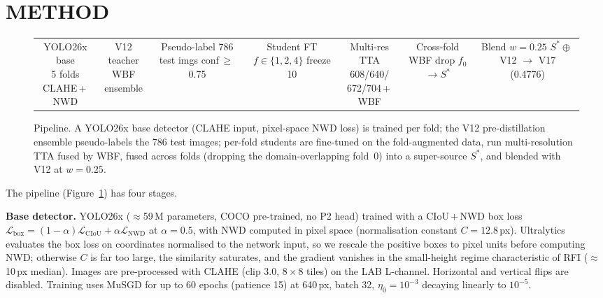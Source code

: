 \documentclass{article}
\begin{document}
\section{METHOD}
\label{sec:method}

\begin{figure}[t]
\centering
\setlength{\fboxsep}{3pt}
\scriptsize
\begin{tabular}{@{}c@{$\,\to\,$}c@{$\,\to\,$}c@{$\,\to\,$}c@{$\,\to\,$}c@{$\,\to\,$}c@{$\,\to\,$}c@{}}
\fbox{\parbox[c][12mm][c]{17mm}{\centering YOLO26x base\\5 folds\\CLAHE\,+\,NWD}} &
\fbox{\parbox[c][12mm][c]{15mm}{\centering V12 teacher\\WBF\\ensemble}} &
\fbox{\parbox[c][12mm][c]{17mm}{\centering Pseudo-label\\786 test imgs\\conf\,$\ge$\,0.75}} &
\fbox{\parbox[c][12mm][c]{17mm}{\centering Student FT\\$f\!\in\!\{1,2,4\}$\\freeze 10}} &
\fbox{\parbox[c][12mm][c]{18mm}{\centering Multi-res TTA\\608/640/\\672/704\,+\,WBF}} &
\fbox{\parbox[c][12mm][c]{17mm}{\centering Cross-fold WBF\\drop $f_0$\\$\to S^{*}$}} &
\fbox{\parbox[c][12mm][c]{19mm}{\centering Blend $w{=}0.25$\\$S^{*}\!\oplus$\,V12\\$\to$ V17 (0.4776)}} \\
\end{tabular}
\caption{Pipeline. A YOLO26x base detector (CLAHE input, pixel-space
NWD loss) is trained per fold; the V12 pre-distillation ensemble
pseudo-labels the 786 test images; per-fold students are fine-tuned
on the fold-augmented data, run multi-resolution TTA fused by WBF,
fused across folds (dropping the domain-overlapping fold~0) into a
super-source $S^{*}$, and blended with V12 at $w{=}0.25$.}
\label{fig:pipeline}
\end{figure}

The pipeline (Figure~\ref{fig:pipeline}) has four stages.

\textbf{Base detector.} YOLO26x \cite{ultralytics2024yolo11}
($\approx$59\,M parameters, COCO pre-trained, no P2 head) trained
with a CIoU\,+\,NWD box loss
$\mathcal{L}_{\mathrm{box}} = (1{-}\alpha)\mathcal{L}_{\mathrm{CIoU}}
{+}\alpha\mathcal{L}_{\mathrm{NWD}}$ at $\alpha{=}0.5$, with NWD
\cite{wang2021nwd} computed in pixel space (normalisation constant
$C{=}12.8$\,px). Ultralytics evaluates the box loss on coordinates
normalised to the network input, so we rescale the positive boxes to
pixel units before computing NWD; otherwise $C$ is far too large, the
similarity saturates, and the gradient vanishes in the small-height
regime characteristic of RFI ($\approx$10\,px median).
Images are pre-processed with CLAHE (clip 3.0, $8\times8$ tiles) on
the LAB L-channel. Horizontal and vertical flips are disabled.
Training uses MuSGD for up to 60 epochs (patience 15) at 640\,px,
batch 32, $\eta_0{=}10^{-3}$ decaying linearly to $10^{-5}$.
\end{document}
